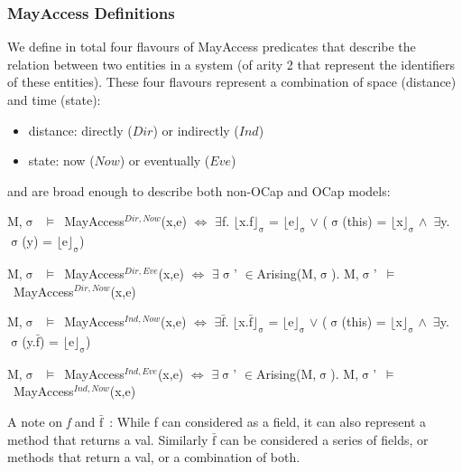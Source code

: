 \documentclass[a4paper,11pt, twoside,twocolumn]{article}
\newenvironment{logic}[1][null]
{\begin{flushleft} \small \label{#1}}
{\end{flushleft}}
\newcommand{\loin}{$\in$}
\newcommand{\loexists}{$\exists$}
\newcommand{\loand}{$\land$}
\newcommand{\loor} {$\lor$}
\newcommand{\losigma}{$\upsigma$}
\newcommand{\loturns} {$\vDash$}
\newcommand{\loiff} {$\iff$}
\newcommand{\loexec}[2] {$\lfloor$#1$\rfloor _{\text{#2}}$}
\newcommand{\loconj}[1] {$\bar{\text{#1}}$}
\newcommand{\ablock} {\null\qquad}
\begin{document}
\subsubsection{MayAccess Definitions}
We define in total four flavours of MayAccess predicates that describe the relation between two entities in a system (of arity 2 that represent the identifiers of these entities). These four flavours represent a combination of space (distance) and time (state):
\begin{itemize}
\item distance: directly ($Dir$) or indirectly ($Ind$)
\item state: now ($Now$) or eventually ($Eve$)
\end{itemize}
and are broad enough to describe both non-OCap and OCap models:
\begin{logic}[MayAccessDirNow]
M,\losigma\ \loturns\ MayAccess$^{Dir,Now}$(x,e) \loiff \linebreak
\ablock \loexists f. \loexec{x.f}{\losigma} = \loexec{e}{\losigma}
\loor \linebreak
\ablock (\losigma(this) = \loexec{x}{\losigma} \loand\ \loexists y. \losigma(y) = \loexec{e}{\losigma})
\end{logic}
\begin{logic}[MayAccessDirEve]
 M,\losigma\ \loturns\ MayAccess$^{Dir,Eve}$(x,e) \loiff \linebreak
\ablock \loexists \losigma' \loin Arising(M,\losigma).\linebreak
\ablock M,\losigma'\ \loturns\ MayAccess$^{Dir,Now}$(x,e) 
\end{logic}
\begin{logic}[MayAccessIndNow]
M,\losigma\ \loturns\ MayAccess$^{Ind,Now}$(x,e) \loiff \linebreak
\ablock \loexists \loconj{f}. \loexec{x.\loconj{f}}{\losigma} = \loexec{e}{\losigma}
\loor \linebreak
\ablock (\losigma(this) = \loexec{x}{\losigma} \loand\ \loexists y. \losigma(y.\loconj{f}) = \loexec{e}{\losigma})
\end{logic}
\begin{logic}[MayAccessIndEve]
M,\losigma\ \loturns\ MayAccess$^{Ind,Eve}$(x,e) \loiff \linebreak
\ablock \loexists \losigma' \loin Arising(M,\losigma).\linebreak
\ablock M,\losigma'\ \loturns\ MayAccess$^{Ind,Now}$(x,e) 
\end{logic}

A note on \textit{f} and \textit{\loconj{f}}\ : While f can considered as a field, it can also represent a method that returns a val.
Similarly \loconj{f} can be considered a series of fields, or methods that return a val, or a combination of both.\\
\end{document}
